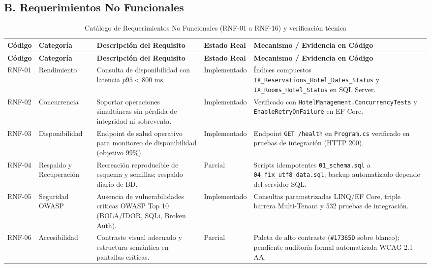 \documentclass[12pt,a4paper]{article}
\begin{document}
\subsection{B. Requerimientos No Funcionales}

\begin{longtable}{p{1.5cm} p{2.3cm} p{4.6cm} p{2.1cm} p{3.9cm}}
\caption{Cat\'alogo de Requerimientos No Funcionales (RNF-01 a RNF-16) y verificaci\'on t\'ecnica}
\label{tab:requerimientos_no_funcionales}\\
\toprule
\textbf{C\'odigo} & \textbf{Categor\'ia} & \textbf{Descripci\'on del Requisito} & \textbf{Estado Real} & \textbf{Mecanismo / Evidencia en C\'odigo}\\
\midrule
\endfirsthead
\toprule
\textbf{C\'odigo} & \textbf{Categor\'ia} & \textbf{Descripci\'on del Requisito} & \textbf{Estado Real} & \textbf{Mecanismo / Evidencia en C\'odigo}\\
\midrule
\endhead
\bottomrule
\endfoot
RNF-01 & Rendimiento & Consulta de disponibilidad con latencia $p95 < 800\text{ ms}$. & Implementado & \'Indices compuestos \texttt{IX\_Reservations\_Hotel\_Dates\_Status} y \texttt{IX\_Rooms\_Hotel\_Status} en SQL Server.\\[0.1cm]
RNF-02 & Concurrencia & Soportar operaciones simult\'aneas sin p\'erdida de integridad ni sobreventa. & Implementado & Verificado con \texttt{HotelManagement.ConcurrencyTests} y \texttt{EnableRetryOnFailure} en EF Core.\\[0.1cm]
RNF-03 & Disponibilidad & Endpoint de salud operativo para monitoreo de disponibilidad (objetivo 99\%). & Implementado & Endpoint \texttt{GET /health} en \texttt{Program.cs} verificado en pruebas de integraci\'on (HTTP 200).\\[0.1cm]
RNF-04 & Respaldo y Recuperaci\'on & Recreaci\'on reproducible de esquema y semillas; respaldo diario de BD. & Parcial & Scripts idempotentes \texttt{01\_schema.sql} a \texttt{04\_fix\_utf8\_data.sql}; backup automatizado depende del servidor SQL.\\[0.1cm]
RNF-05 & Seguridad OWASP & Ausencia de vulnerabilidades cr\'iticas OWASP Top 10 (BOLA/IDOR, SQLi, Broken Auth). & Implementado & Consultas parametrizadas LINQ/EF Core, triple barrera Multi-Tenant y 532 pruebas de integraci\'on.\\[0.1cm]
RNF-06 & Accesibilidad & Contraste visual adecuado y estructura sem\'antica en pantallas cr\'iticas. & Parcial & Paleta de alto contraste (\texttt{\#17365D} sobre blanco); pendiente auditor\'ia formal automatizada WCAG 2.1 AA.\\[0.1cm]

\end{longtable}
\end{document}
